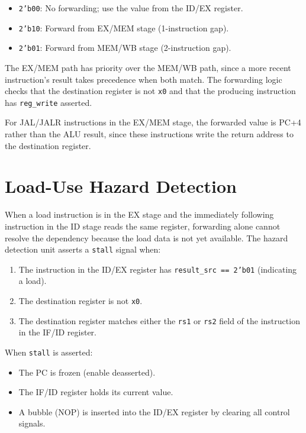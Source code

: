 \documentclass[12pt,a4paper]{report}
\begin{document}
\begin{itemize}
    \item \texttt{2'b00}: No forwarding; use the value from the ID/EX register.
    \item \texttt{2'b10}: Forward from EX/MEM stage (1-instruction gap).
    \item \texttt{2'b01}: Forward from MEM/WB stage (2-instruction gap).
\end{itemize}

The EX/MEM path has priority over the MEM/WB path, since a more recent instruction's
result takes precedence when both match. The forwarding logic checks that the
destination register is not \texttt{x0} and that the producing instruction has
\texttt{reg\_write} asserted.

For JAL/JALR instructions in the EX/MEM stage, the forwarded value is PC+4 rather
than the ALU result, since these instructions write the return address to the
destination register.

\section{Load-Use Hazard Detection}
When a load instruction is in the EX stage and the immediately following instruction
in the ID stage reads the same register, forwarding alone cannot resolve the
dependency because the load data is not yet available. The hazard detection unit
asserts a \texttt{stall} signal when:

\begin{enumerate}
    \item The instruction in the ID/EX register has \texttt{result\_src == 2'b01}
          (indicating a load).
    \item The destination register is not \texttt{x0}.
    \item The destination register matches either the \texttt{rs1} or \texttt{rs2}
          field of the instruction in the IF/ID register.
\end{enumerate}

When \texttt{stall} is asserted:
\begin{itemize}
    \item The PC is frozen (enable deasserted).
    \item The IF/ID register holds its current value.
    \item A bubble (NOP) is inserted into the ID/EX register by clearing all control
          signals.
\end{itemize}
\end{document}
